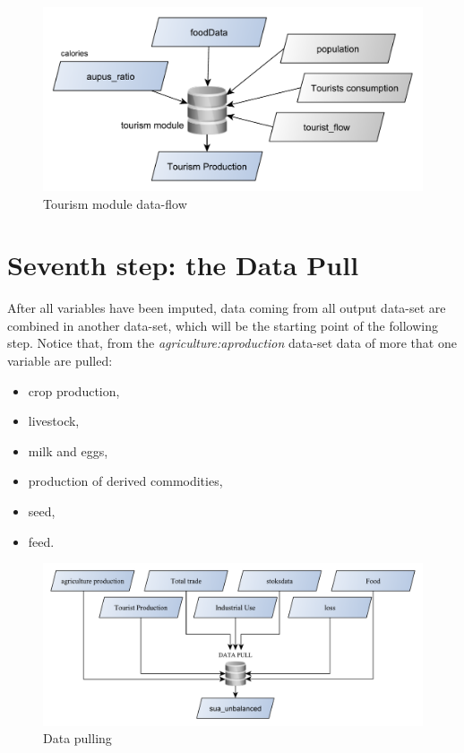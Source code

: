 \documentclass[]{article}
\providecommand{\tightlist}{%
  \setlength{\itemsep}{0pt}\setlength{\parskip}{0pt}}
\begin{document}
\begin{figure}[H]

{\centering \includegraphics[width=0.6\linewidth]{images/SwsFbs/16_tourism} 

}

\caption{\label{fig:f16}Tourism module data-flow}\label{fig:f16}
\end{figure}

\section{Seventh step: the Data Pull}\label{seventh-step-the-data-pull}

After all variables have been imputed, data coming from all output
data-set are combined in another data-set, which will be the starting
point of the following step. Notice that, from the
\emph{agriculture:aproduction} data-set data of more that one variable
are pulled:

\begin{itemize}
\tightlist
\item
  crop production,
\item
  livestock,
\item
  milk and eggs,
\item
  production of derived commodities,
\item
  seed,
\item
  feed.
\end{itemize}

\begin{figure}[H]

{\centering \includegraphics[width=0.9\linewidth]{images/SwsFbs/17_pulldata} 

}

\caption{\label{fig:f17}Data pulling}\label{fig:f17}
\end{figure}
\end{document}

